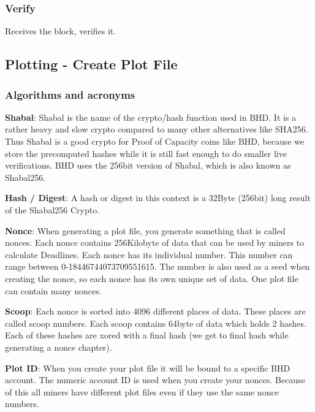 \subsubsection{Verify}
\begin{flushleft}
    Receives the block, verifies it.
\end{flushleft}
\subsection{Plotting - Create Plot File}
\subsubsection{Algorithms and acronyms}
\begin{flushleft}
    \textbf{Shabal}: Shabal is the name of the crypto/hash function used in BHD. It is a rather heavy and slow crypto compared to many other alternatives like SHA256. Thus Shabal is a good crypto for Proof of Capacity coins like BHD, because we store the precomputed hashes while it is still fast enough to do smaller live verifications. BHD uses the 256bit version of Shabal, which is also known as Shabal256.
\end{flushleft}
\begin{flushleft}
    \textbf{Hash / Digest}: A hash or digest in this context is a 32Byte (256bit) long result of the Shabal256 Crypto.
\end{flushleft}
\begin{flushleft}
    \textbf{Nonce}: When generating a plot file, you generate something that is called nonces. Each nonce contains 256Kilobyte of data that can be used by miners to calculate Deadlines. Each nonce has its individual number. This number can range between 0-18446744073709551615. The number is also used as a seed when creating the nonce, so each nonce has its own unique set of data. One plot file can contain many nonces.
\end{flushleft}
\begin{flushleft}
    \textbf{Scoop}: Each nonce is sorted into 4096 different places of data. These places are called scoop numbers. Each scoop contains 64byte of data which holds 2 hashes. Each of these hashes are xored with a final hash (we get to final hash while generating a nonce chapter).
\end{flushleft}
\begin{flushleft}
    \textbf{Plot ID}: When you create your plot file it will be bound to a specific BHD account. The numeric account ID is used when you create your nonces. Because of this all miners have different plot files even if they use the same nonce numbers.
\end{flushleft}
